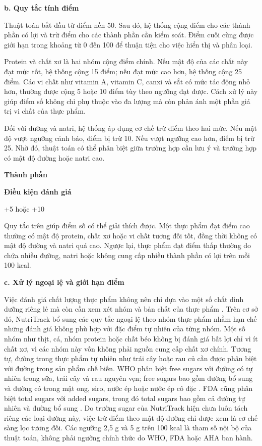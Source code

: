 \documentclass[12pt, a4paper]{report}
\begin{document}
\textbf{b. Quy tắc tính điểm}

Thuật toán bắt đầu từ điểm nền 50. Sau đó, hệ thống cộng điểm cho các thành phần có lợi và trừ điểm cho các thành phần cần kiểm soát. Điểm cuối cùng được giới hạn trong khoảng từ 0 đến 100 để thuận tiện cho việc hiển thị và phân loại.

Protein và chất xơ là hai nhóm cộng điểm chính. Nếu mật độ của các chất này đạt mức tốt, hệ thống cộng 15 điểm; nếu đạt mức cao hơn, hệ thống cộng 25 điểm. Các vi chất như vitamin A, vitamin C, canxi và sắt có mức tác động nhỏ hơn, thường được cộng 5 hoặc 10 điểm tùy theo ngưỡng đạt được. Cách xử lý này giúp điểm số không chỉ phụ thuộc vào đa lượng mà còn phản ánh một phần giá trị vi chất của thực phẩm.

Đối với đường và natri, hệ thống áp dụng cơ chế trừ điểm theo hai mức. Nếu mật độ vượt ngưỡng cảnh báo, điểm bị trừ 10. Nếu vượt ngưỡng cao hơn, điểm bị trừ 25. Nhờ đó, thuật toán có thể phân biệt giữa trường hợp cần lưu ý và trường hợp có mật độ đường hoặc natri cao.

\textbf{Thành phần}

\textbf{Điều kiện đánh giá}

+5 hoặc +10

Quy tắc trên giúp điểm số có thể giải thích được. Một thực phẩm đạt điểm cao thường có mật độ protein, chất xơ hoặc vi chất tương đối tốt, đồng thời không có mật độ đường và natri quá cao. Ngược lại, thực phẩm đạt điểm thấp thường do chứa nhiều đường, natri hoặc không cung cấp nhiều thành phần có lợi trên mỗi 100 kcal.

\textbf{c. Xử lý ngoại lệ và giới hạn điểm}

Việc đánh giá chất lượng thực phẩm không nên chỉ dựa vào một số chất dinh dưỡng riêng lẻ mà còn cần xem xét nhóm và bản chất của thực phẩm \cite{drewnowski2019}. Trên cơ sở đó, NutriTrack bổ sung các quy tắc ngoại lệ theo nhóm thực phẩm nhằm hạn chế những đánh giá không phù hợp với đặc điểm tự nhiên của từng nhóm. Một số nhóm như thịt, cá, nhóm protein hoặc chất béo không bị đánh giá bất lợi chỉ vì ít chất xơ, vì các nhóm này vốn không phải nguồn cung cấp chất xơ chính. Tương tự, đường trong thực phẩm tự nhiên như trái cây hoặc rau củ cần được phân biệt với đường trong sản phẩm chế biến. WHO phân biệt free sugars với đường có tự nhiên trong sữa, trái cây và rau nguyên vẹn; free sugars bao gồm đường bổ sung và đường có trong mật ong, siro, nước ép hoặc nước ép cô đặc \cite{who2015}. FDA cũng phân biệt total sugars với added sugars, trong đó total sugars bao gồm cả đường tự nhiên và đường bổ sung \cite{fda_addedsugars}. Do trường sugar của NutriTrack hiện chưa luôn tách riêng các loại đường này, việc trừ điểm theo mật độ đường chỉ được xem là cơ chế sàng lọc tương đối. Các ngưỡng 2,5 g và 5 g trên 100 kcal là tham số nội bộ của thuật toán, không phải ngưỡng chính thức do WHO, FDA hoặc AHA ban hành.
\end{document}
